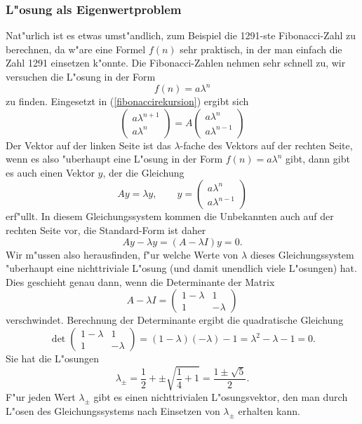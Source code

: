 \subsubsection{L"osung als Eigenwertproblem}
Nat"urlich ist es etwas umst"andlich, zum Beispiel die 1291-ste Fibonacci-Zahl
zu berechnen, da w"are eine Formel $f(n)$ sehr praktisch, in der man einfach
die Zahl 1291 einsetzen k"onnte.
Die Fibonacci-Zahlen nehmen sehr schnell zu, 
wir versuchen die L"osung in der Form
$$f(n)=a\lambda^n$$
zu finden. Eingesetzt in (\ref{fibonaccirekursion}) ergibt sich
$$
\begin{pmatrix}a\lambda^{n+1}\\a\lambda^n\end{pmatrix}
=A\begin{pmatrix}a\lambda^n\\a\lambda^{n-1}\end{pmatrix}
$$
Der Vektor auf der linken Seite ist das $\lambda$-fache des Vektors
auf der rechten Seite, wenn es also "uberhaupt eine L"osung in der
Form $f(n)=a\lambda^n$ gibt, dann gibt es auch einen Vektor $y$, der
die Gleichung
\begin{equation}
Ay=\lambda y, \qquad y=\begin{pmatrix}
a\lambda^n\\a\lambda^{n-1}
\end{pmatrix}
\end{equation}
erf"ullt. In diesem Gleichungssystem kommen die Unbekannten auch auf
der rechten Seite vor, die Standard-Form ist daher
$$Ay-\lambda y=(A-\lambda I)y=0.$$
Wir m"ussen also herausfinden, f"ur welche Werte von $\lambda$ dieses
Gleichungssystem "uberhaupt eine nichttriviale L"osung (und damit unendlich
viele L"osungen) hat. Dies geschieht genau dann, wenn die Determinante
der Matrix
$$A-\lambda I=\begin{pmatrix}1-\lambda&1\\1&-\lambda\end{pmatrix}$$
verschwindet. Berechnung der
Determinante ergibt die quadratische Gleichung
$$\det
\begin{pmatrix}1-\lambda&1\\1&-\lambda\end{pmatrix}
=(1-\lambda)(-\lambda)-1=\lambda^2-\lambda-1=0.
$$
Sie hat die L"osungen
$$
\lambda_{\pm}=\frac12+\pm\sqrt{\frac14+1}=\frac{1\pm\sqrt{5}}2.
$$
F"ur jeden Wert $\lambda_{\pm}$ gibt es einen nichttrivialen
L"osungsvektor, den man durch L"osen des Gleichungssystems nach
Einsetzen von $\lambda_{\pm}$ erhalten kann. 

